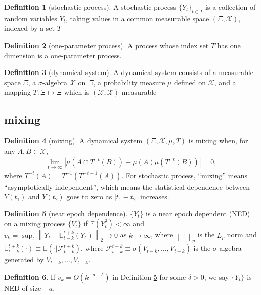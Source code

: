 \documentclass[12pt]{article}
\def\mc#1{\mathcal{#1}} %
\def\E{\mathbb{E}} %
\def\mc#1{\mathcal{#1}}
\newcommand{\norm}[1]{\left\lVert#1\right\rVert} %
\theoremstyle{definition}
\theoremstyle{definition}
\newtheorem{definition}{Definition}
\begin{document}
\begin{definition}[stochastic process]
  A stochastic process $\{Y_t\}_{t\in T}$ is a collection of random variables $Y_t$, taking values in a common measurable space $(\Xi, \mc{X})$, indexed by a set $T$
\end{definition}

\begin{definition}[one-parameter process]
  A  process whose index set $T$ has one dimension is a one-parameter process.
\end{definition}

\begin{definition}[dynamical system]
  A dynamical system  consists of a measurable space $\Xi$, a $\sigma$-algebra $\mc{X}$ on $\Xi$, a probability measure $\mu$ defined on $\mc{X}$, and a mapping $T\colon \Xi \mapsto \Xi$ which is $(\mc{X},\mc{X})$-measurable
\end{definition}

\subsection{mixing}

\begin{definition}[mixing]
  A dynamical system $(\Xi, \mc{X}, \mu, T)$ is mixing when, for any $A,B \in \mc{X}$,
  \begin{align*}
    \lim_{t\to \infty} |\mu(A\cap T^{-t}(B))-\mu(A)\mu(T^{-t}(B))|=0,
  \end{align*}
  where $T^{-t}(A)=T^{-1}(T^{-t+1}(A))$.
  For stochastic process, ``mixing'' means ``asymptotically independent'', which means the statistical dependence between $Y(t_1)$ and $Y(t_2)$ goes to zero as $|t_1-t_2|$ increases.
\end{definition}



\begin{definition}[near epoch dependence]
\label{ned}  $\{Y_t\}$ is a near epoch dependent (NED) on a mixing process $\{V_t\}$ if $\E (Y_t^2) < \infty$ and $v_k= \sup_t \norm{Y_t-\E_{t-k}^{t+k}(Y_t)}_2 \to 0$ as $k \to \infty$, where $\norm{\cdot}_p$ is the $L_p$ norm and $\E_{t-k}^{t+k}(\cdot) \equiv \E (\cdot | \mc{F}_{t-k}^{t+k})$, where $\mc{F}_{t-k}^{t+k}\equiv \sigma(V_{t-k}, \ldots, V_{t+k})$ is the $\sigma$-algebra generated by $V_{t-k}, \ldots, V_{t+k}$.
\end{definition}

\begin{definition}
  If $v_k= O(k^{-a-\delta})$ in Definition \ref{ned} for some $\delta > 0$, we say $\{Y_t\}$ is NED of size $-a$.
\end{definition}
\end{document}

